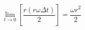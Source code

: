 \begin{equation*}
\lim_{t \rightarrow 0}\left[\frac{r(r\omega\Delta t)}{2}\right] = \frac{\omega r^{2}}{2} \tag{4.10}
\end{equation*}
